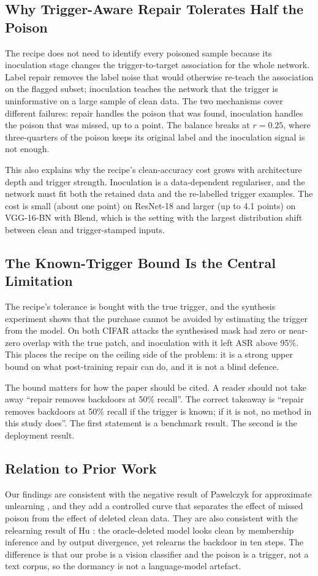 \subsection{Why Trigger-Aware Repair Tolerates Half the Poison}
The recipe does not need to identify every poisoned sample because its
inoculation stage changes the trigger-to-target association for the whole
network. Label repair removes the label noise that would otherwise re-teach the
association on the flagged subset; inoculation teaches the network that the
trigger is uninformative on a large sample of clean data. The two mechanisms
cover different failures: repair handles the poison that was found, inoculation
handles the poison that was missed, up to a point. The balance breaks at
$r{=}0.25$, where three-quarters of the poison keeps its original label and the
inoculation signal is not enough.

This also explains why the recipe's clean-accuracy cost grows with architecture
depth and trigger strength. Inoculation is a data-dependent regulariser, and the
network must fit both the retained data and the re-labelled trigger examples. The
cost is small (about one point) on ResNet-18 and larger (up to 4.1 points) on
VGG-16-BN with Blend, which is the setting with the largest distribution shift
between clean and trigger-stamped inputs.

\subsection{The Known-Trigger Bound Is the Central Limitation}
The recipe's tolerance is bought with the true trigger, and the synthesis
experiment shows that the purchase cannot be avoided by estimating the trigger
from the model. On both CIFAR attacks the synthesised mask had zero or near-zero
overlap with the true patch, and inoculation with it left ASR above 95\%. This
places the recipe on the ceiling side of the problem: it is a strong upper bound
on what post-training repair can do, and it is not a blind defence.

The bound matters for how the paper should be cited. A reader should not take
away ``repair removes backdoors at 50\% recall''. The correct takeaway is
``repair removes backdoors at 50\% recall if the trigger is known; if it is not,
no method in this study does''. The first statement is a benchmark result. The
second is the deployment result.

\subsection{Relation to Prior Work}
Our findings are consistent with the negative result of Pawelczyk \etal{} for
approximate unlearning \cite{pawelczyk}, and they add a controlled curve that
separates the effect of missed poison from the effect of deleted clean data. They
are also consistent with the relearning result of Hu \etal{} \cite{jogging}: the
oracle-deleted model looks clean by membership inference and by output
divergence, yet relearns the backdoor in ten steps. The difference is that our
probe is a vision classifier and the poison is a trigger, not a text corpus, so
the dormancy is not a language-model artefact.

